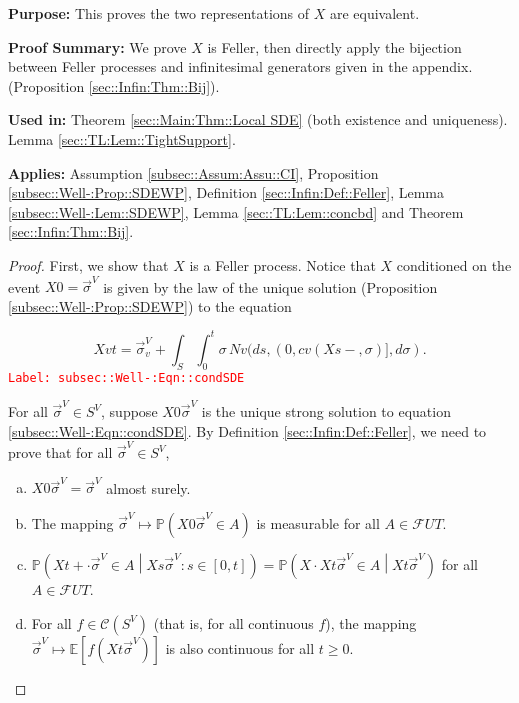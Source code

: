 \documentclass[12pt]{article}
\newcommand{\mb}{\mathbb}
\newcommand{\mc}{\mathcal}
\newcommand{\tr}{\textcolor{red}}
\newcommand{\labe}[1]{\tr{\texttt{Label: #1}}}
\newcommand{\purpose}{\textbf{Purpose: }}
\newcommand{\pfsum}{\textbf{Proof Summary: }}
\newcommand{\usein}{\textbf{Used in: }}
\newcommand{\app}{\textbf{Applies: }}
\newcommand{\pr}{\mb{P}}							%
\newcommand{\ex}[1]{\mb{E}\left[#1\right]}			%
\renewcommand{\v}{v}							%
\renewcommand{\U}{U}							%
\renewcommand{\S}{S}							%
\newcommand{\s}{\sigma}							%
\newcommand{\sv}{\vec{\s}}						%
\newcommand{\T}{T}								%
\renewcommand{\t}{t}							%
\renewcommand{\tt}{s}							%
\newcommand{\F}{\mc{F}}							%
\newcommand{\X}{X}								%
\newcommand{\IGr}{c}							%
\newcommand{\carp}[1]{^{#1}}					%
\newcommand{\vsi}[1]{^{#1}}						%
\newcommand{\cind}[1]{_{#1}}					%
\newcommand{\cont}{\mc{C}}						%
\newcommand{\poiss}{N}							%
\begin{document}
\purpose This proves the two representations of \(\X{}{}\) are equivalent.

\pfsum We prove \(\X{}{}\) is Feller, then directly apply the bijection between Feller processes and infinitesimal generators given in the appendix. (Proposition \ref{sec::Infin:Thm::Bij}).

\usein Theorem \ref{sec::Main:Thm::Local SDE} (both existence and uniqueness). Lemma \ref{sec::TL:Lem::TightSupport}.

\app Assumption \ref{subsec::Assum:Assu::CI}, Proposition \ref{subsec::Well-:Prop::SDEWP}, Definition \ref{sec::Infin:Def::Feller}, Lemma \ref{subsec::Well-:Lem::SDEWP}, Lemma \ref{sec::TL:Lem::concbd} and Theorem \ref{sec::Infin:Thm::Bij}.

\begin{proof}
First, we show that \(\X{}{}\) is a Feller process. Notice that \(\X{}{}\) conditioned on the event \(\X{}{0} = \sv\cind{}\vsi{V}\) is given by the law of the unique solution (Proposition \ref{subsec::Well-:Prop::SDEWP}) to the equation

\begin{equation}
\X{\v}{\t} = \sv\cind{\v}\vsi{V} + \int_\S\int_0^\t \s\,\poiss{\v}(d\tt,(0,\IGr{\v}(\X{}{\tt-},\s)],d\s).
\label{subsec::Well-:Eqn::condSDE}
\end{equation}
\labe{subsec::Well-:Eqn::condSDE}

For all \(\sv\cind{}\vsi{V}\in\S\carp{V}\), suppose \(\X{}{0}{\sv\cind{}\vsi{V}}\) is the unique strong solution to equation \eqref{subsec::Well-:Eqn::condSDE}. By Definition \ref{sec::Infin:Def::Feller}, we need to prove that for all \(\sv\cind{}\vsi{V}\in \S\carp{V}\),

\begin{enumerate}[(a)]
\item \(\X{}{0}{\sv\cind{}\vsi{V}} = \sv\cind{}\vsi{V}\) almost surely.

\item The mapping \(\sv\cind{}\vsi{V}\mapsto \pr\left(\X{}{0}{\sv\cind{}\vsi{V}}\in A\right)\) is measurable for all \(A\in \F{\U}{\T}\).

\item \(\pr\left(\X{}{\t+\cdot}{\sv\cind{}\vsi{V}}\in A\middle|\X{}{\tt}{\sv\cind{}\vsi{V}}:\tt \in [0,\t]\right) = \pr\left(\X{}{\cdot}{\X{}{\t}{\sv\cind{}\vsi{V}}} \in A\middle| \X{}{\t}{\sv\cind{}\vsi{V}} \right)\) for all \(A \in \F{\U}{\T}\).

\item For all \(f \in \cont(\S\carp{V})\) (that is, for all continuous \(f\)), the mapping \(\sv\cind{}\vsi{V}\mapsto \ex{f(\X{}{\t}{\sv\cind{}\vsi{V}})}\) is also continuous for all \(\t\geq 0\).
\end{enumerate}


\end{proof}
\end{document}
